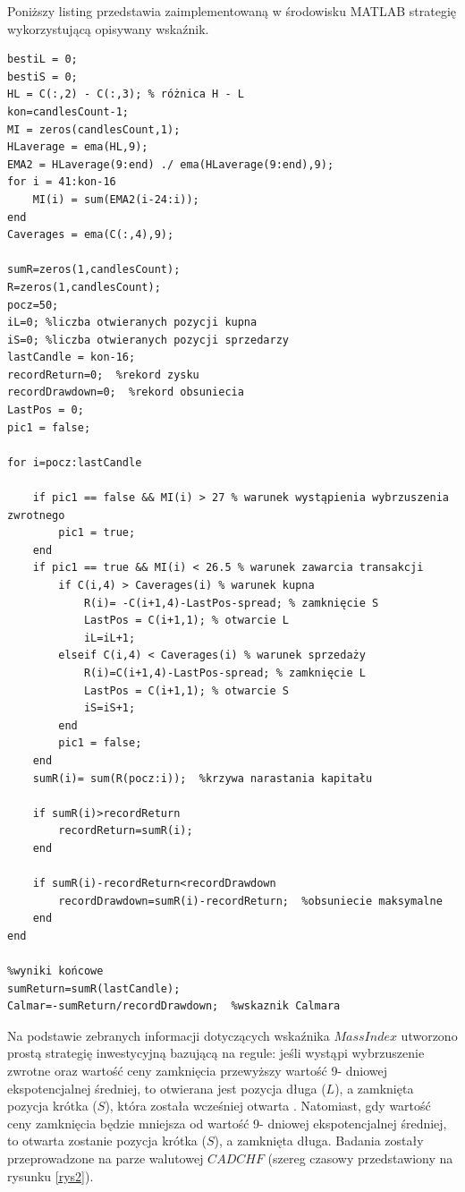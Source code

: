 \documentclass[12pt,a4paper]{article}
\begin{document}
\noindent Poniższy listing przedstawia zaimplementowaną w środowisku MATLAB strategię wykorzystującą opisywany wskaźnik.
\begin{scriptsize}
\begin{lstlisting}
bestiL = 0;
bestiS = 0;
HL = C(:,2) - C(:,3); % różnica H - L
kon=candlesCount-1;
MI = zeros(candlesCount,1);
HLaverage = ema(HL,9);
EMA2 = HLaverage(9:end) ./ ema(HLaverage(9:end),9);
for i = 41:kon-16
    MI(i) = sum(EMA2(i-24:i));
end
Caverages = ema(C(:,4),9);

sumR=zeros(1,candlesCount);
R=zeros(1,candlesCount);
pocz=50;
iL=0; %liczba otwieranych pozycji kupna
iS=0; %liczba otwieranych pozycji sprzedarzy
lastCandle = kon-16;
recordReturn=0;  %rekord zysku
recordDrawdown=0;  %rekord obsuniecia
LastPos = 0;
pic1 = false;

for i=pocz:lastCandle
    
    if pic1 == false && MI(i) > 27 % warunek wystąpienia wybrzuszenia zwrotnego
        pic1 = true;
    end
    if pic1 == true && MI(i) < 26.5 % warunek zawarcia transakcji
        if C(i,4) > Caverages(i) % warunek kupna
            R(i)= -C(i+1,4)-LastPos-spread; % zamknięcie S
            LastPos = C(i+1,1); % otwarcie L
            iL=iL+1;
        elseif C(i,4) < Caverages(i) % warunek sprzedaży
            R(i)=C(i+1,4)-LastPos-spread; % zamknięcie L
            LastPos = C(i+1,1); % otwarcie S
            iS=iS+1;
        end
        pic1 = false;
    end
    sumR(i)= sum(R(pocz:i));  %krzywa narastania kapitału
    
    if sumR(i)>recordReturn
        recordReturn=sumR(i);
    end
    
    if sumR(i)-recordReturn<recordDrawdown
        recordDrawdown=sumR(i)-recordReturn;  %obsuniecie maksymalne
    end
end

%wyniki końcowe
sumReturn=sumR(lastCandle);
Calmar=-sumReturn/recordDrawdown;  %wskaznik Calmara
\end{lstlisting}
\end{scriptsize}


Na podstawie zebranych informacji dotyczących wskaźnika $Mass Index$ utworzono prostą strategię inwestycyjną bazującą na regule: jeśli wystąpi wybrzuszenie zwrotne oraz wartość ceny zamknięcia przewyższy wartość 9- dniowej ekspotencjalnej średniej, to otwierana jest pozycja długa ($L$), a zamknięta pozycja krótka ($S$), która została wcześniej otwarta . Natomiast, gdy wartość ceny zamknięcia będzie mniejsza od wartość 9- dniowej ekspotencjalnej średniej, to otwarta zostanie pozycja krótka ($S$), a zamknięta długa. Badania zostały przeprowadzone na parze walutowej $CADCHF$ (szereg czasowy przedstawiony na rysunku \ref{rys2}). \\
\end{document}
